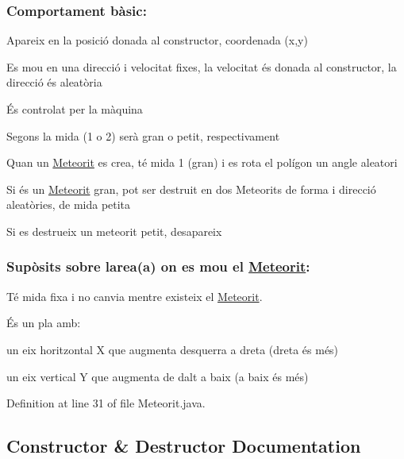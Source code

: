 \subsubsection*{Comportament bàsic\+: }


\begin{DoxyItemize}
\item Apareix en la posició donada al constructor, coordenada (x,y)
\item Es mou en una direcció i velocitat fixes, la velocitat és donada al constructor, la direcció és aleatòria
\item És controlat per la màquina
\item Segons la mida (1 o 2) serà gran o petit, respectivament
\item Quan un \hyperlink{class_meteorit}{Meteorit} es crea, té mida 1 (gran) i es rota el polígon un angle aleatori
\item Si és un \hyperlink{class_meteorit}{Meteorit} gran, pot ser destruit en dos Meteorits de forma i direcció aleatòries, de mida petita
\item Si es destrueix un meteorit petit, desapareix
\end{DoxyItemize}

\subsubsection*{Supòsits sobre l\textquotesingle{}area(a) on es mou el \hyperlink{class_meteorit}{Meteorit}\+: }

Té mida fixa i no canvia mentre existeix el \hyperlink{class_meteorit}{Meteorit}.

És un pla amb\+:
\begin{DoxyItemize}
\item un eix horitzontal X que augmenta d\textquotesingle{}esquerra a dreta (dreta és més)
\item un eix vertical Y que augmenta de dalt a baix (a baix és més) 
\end{DoxyItemize}

Definition at line 31 of file Meteorit.\+java.



\subsection{Constructor \& Destructor Documentation}
\hypertarget{class_meteorit_a9dcc96793a206baab2cc5aa5141a30f5}{}

